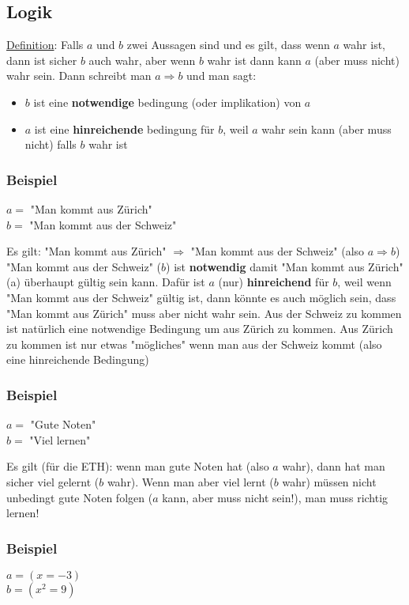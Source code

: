 \documentclass[11pt]{article} %
\begin{document}
\subsection{Logik}
\underline{Definition}: Falls $a$ und $b$ zwei Aussagen sind und es gilt, dass wenn $a$ wahr ist, dann ist sicher $b$ auch wahr, aber wenn $b$ wahr ist dann kann $a$ (aber muss nicht) wahr sein. Dann schreibt man $a \Rightarrow b$ und man sagt:
\begin{itemize}
\item $b$ ist eine {\bf notwendige} bedingung (oder implikation) von $a$
\item $a$ ist eine {\bf hinreichende} bedingung für $b$, weil $a$ wahr sein kann (aber muss nicht) falls $b$ wahr ist  
\end{itemize}

\subsubsection{Beispiel}

$a =$ "Man kommt aus Zürich"\\
$b =$ "Man kommt aus der Schweiz"

Es gilt: "Man kommt aus Zürich" $\Rightarrow$ "Man kommt aus der Schweiz" (also $a \Rightarrow b$)
"Man kommt aus der Schweiz" ($b$) ist {\bf notwendig} damit "Man kommt aus Zürich" (a) überhaupt gültig sein kann. Dafür ist $a$ (nur)  {\bf hinreichend} für $b$, weil wenn "Man kommt aus der Schweiz" gültig ist, dann könnte es auch möglich sein, dass "Man kommt aus Zürich" muss aber nicht wahr sein. Aus der Schweiz zu kommen ist natürlich eine notwendige Bedingung um aus Zürich zu kommen. Aus Zürich zu kommen ist nur etwas "mögliches" wenn man aus der Schweiz kommt (also eine hinreichende Bedingung)

\subsubsection{Beispiel}

$a=$ "Gute Noten"\\
$b=$ "Viel lernen"

Es gilt (für die ETH): wenn man gute Noten hat (also $a$ wahr), dann hat man sicher viel gelernt ($b$ wahr). Wenn man aber viel lernt ($b$ wahr) müssen nicht unbedingt gute Noten folgen ($a$ kann, aber muss nicht sein!), man muss richtig lernen! \\

\subsubsection{Beispiel}
$a = (x  = -3)$\\
$b = (x^2 = 9)$
\end{document}
